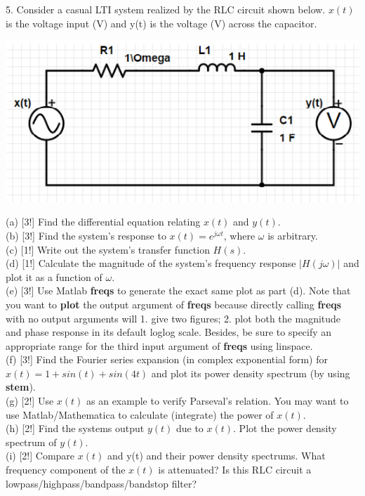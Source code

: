 \documentclass[12pt,a4paper]{article}
\begin{document}
\begin{tcolorbox}[colback = white]
5. Consider a casual LTI system realized by the RLC circuit shown below. $x(t)$ is the voltage input (V) and y(t) is the voltage (V) across the capacitor.\\
\begin{center}
    \includegraphics[scale=0.5]{p5.png}
\end{center}
(a) [3!] Find the differential equation relating $x(t)$ and $y(t)$.\\
(b) [3!] Find the system's response to $x(t)=e^{j\omega t}$, where $\omega$ is arbitrary.\\
(c) [1!] Write out the system's transfer function $H(s)$.\\
(d) [1!] Calculate the magnitude of the system's frequency response $|H(j\omega)|$ and plot it as a function of $\omega$.\\
(e) [3!] Use Matlab \textbf{freqs} to generate the exact same plot as part (d). Note that you want to \textbf{plot} the output argument of \textbf{freqs} because directly calling \textbf{freqs} with no output arguments will 1. give two figures; 2. plot both the magnitude and phase response in its default loglog scale. Besides, be sure to specify an appropriate range for the third input argument of \textbf{freqs} using linspace.\\
(f) [3!] Find the Fourier series expansion (in complex exponential form) for $x(t)=1+sin(t)+sin(4t)$ and plot its power density spectrum (by using \textbf{stem}).\\
(g) [2!] Use $x(t)$ as an example to verify Parseval's relation. You may want to use Matlab/Mathematica to calculate (integrate) the power of $x(t)$.\\
(h) [2!] Find the systems output $y(t)$ due to $x(t)$. Plot the power density spectrum of $y(t)$.\\
(i) [2!] Compare $x(t)$ and y(t) and their power density spectrums. What frequency component of the $x(t)$ is attenuated? Is this RLC circuit a lowpass/highpass/bandpass/bandstop filter?
\end{tcolorbox}
\end{document}
